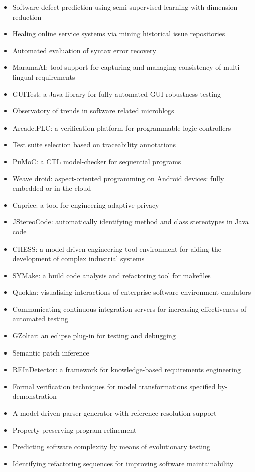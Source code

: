 {\begin{itemize}[itemsep=-1ex]
  \item Software defect prediction using semi-supervised learning with dimension reduction
  \item Healing online service systems via mining historical issue repositories
  \item Automated evaluation of syntax error recovery
  \item MaramaAI: tool support for capturing and managing consistency of multi-lingual requirements
  \item GUITest: a Java library for fully automated GUI robustness testing
  \item Observatory of trends in software related microblogs
  \item Arcade.PLC: a verification platform for programmable logic controllers
  \item Test suite selection based on traceability annotations
  \item PuMoC: a CTL model-checker for sequential programs
  \item Weave droid: aspect-oriented programming on Android devices: fully embedded or in the cloud
  \item Caprice: a tool for engineering adaptive privacy
  \item JStereoCode: automatically identifying method and class stereotypes in Java code
  \item CHESS: a model-driven engineering tool environment for aiding the development of complex industrial systems
  \item SYMake: a build code analysis and refactoring tool for makefiles
  \item Quokka: visualising interactions of enterprise software environment emulators
  \item Communicating continuous integration servers for increasing effectiveness of automated testing
  \item GZoltar: an eclipse plug-in for testing and debugging
  \item Semantic patch inference
  \item REInDetector: a framework for knowledge-based requirements engineering
  \item Formal verification techniques for model transformations specified by-demonstration
  \item A model-driven parser generator with reference resolution support
  \item Property-preserving program refinement
  \item Predicting software complexity by means of evolutionary testing
  \item Identifying refactoring sequences for improving software maintainability
\end{itemize}
}

